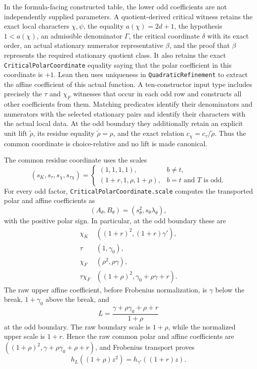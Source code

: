 \begin{definition}
In the formula-facing constructed table, the lower odd coefficients are not
independently supplied parameters.  A quotient-derived critical witness
retains the exact local characters
\(\chi,\psi\), the equality \(a(\chi)=2d+1\), the hypothesis
\(1<a(\chi)\), an admissible denominator \(\Gamma\), the critical coordinate
\(\delta\) with its exact order, an actual stationary numerator
representative \(\beta\), and the proof that \(\beta\) represents the required
stationary quotient class.  It also retains the exact
\texttt{CriticalPolarCoordinate} equality saying that the polar coefficient
in this coordinate is \(+1\).  Lean then uses uniqueness in
\texttt{QuadraticRefinement} to extract the affine coefficient of this actual
function.  A ten-constructor input type includes precisely the \(\tau\) and
\(\chi_F\) witnesses that occur in each odd row and constructs all other
coefficients from them.  Matching predicates identify their denominators and
numerators with the selected stationary pairs and identify their characters
with the actual local data.  At the odd boundary they additionally retain an
explicit unit lift \(\widetilde\rho\), its residue equality
\(\overline{\widetilde\rho}=\rho\), and the exact relation
\(c_\chi=c_\tau/\widetilde\rho\).  Thus the common coordinate is
choice-relative and no lift is made canonical.

The common residue coordinate uses the scales
\[
 (s_K,s_\tau,s_\chi,s_{\tau\chi})=
 \begin{cases}
 (1,1,1,1),&b\ne t,\\
 (1+r,1,\rho,1+\rho),&b=t\text{ and }T\text{ is odd}.
 \end{cases}
\]
For every odd factor, \texttt{CriticalPolarCoordinate.scale} computes the
transported polar and affine coefficients as
\[
 (A_\theta,B_\theta)=(s_\theta^2,s_\theta\lambda_\theta),
\]
with the positive polar sign.  In particular, at the odd boundary these are
\[
\begin{array}{c|c}
\chi_K&((1+r)^2,(1+r)\gamma'),\\
\tau&(1,\gamma _0),\\
\chi_F&(\rho^2,\rho\gamma),\\
\tau\chi_F&((1+\rho)^2,\gamma _0+\rho\gamma+r).
\end{array}
\]
The raw upper affine coefficient, before Frobenius normalization, is
\(\gamma\) below the break, \(1+\gamma _0\) above the break, and
\[
 L=\frac{\gamma+\rho\gamma _0+\rho+r}{1+\rho}
\]
at the odd boundary.  The raw boundary scale is \(1+\rho\), while the
normalized upper scale is \(1+r\).  Hence the raw common polar and affine
coefficients are \(((1+\rho)^2,
\gamma+\rho\gamma _0+\rho+r)\), and Frobenius transport proves
\[
 h_L((1+\rho)z^2)=h_{\gamma'}((1+r)z).
\]


\end{definition}
